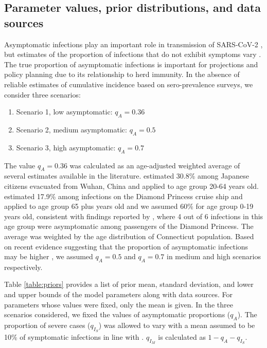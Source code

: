 \documentclass[11pt]{article}
\begin{document}
\subsection{Parameter values, prior distributions, and data sources}

Asymptomatic infections play an important role in transmission of SARS-CoV-2 \citep{furukawa2020evidence}, but estimates of the proportion of infections that do not exhibit symptoms vary \citep{he2020estimation, nishiura2020estimation, mizumoto2020estimating, emery2020contribution}. The true proportion of asymptomatic infections is important for projections and policy planning due to its relationship to herd immunity. In the absence of reliable estimates of cumulative incidence based on sero-prevalence surveys, we consider three scenarios: 

\begin{enumerate}
	\item Scenario 1, low asymptomatic: $q_A = 0.36$
	\item Scenario 2, medium asymptomatic: $q_A = 0.5$
	\item Scenario 3, high asymptomatic: $q_A = 0.7$
\end{enumerate}

The value $q_A = 0.36$ was calculated as an age-adjusted weighted average of several estimates available in the literature.  
\citet{nishiura2020estimation} estimated 30.8\% among Japanese citizens evacuated from Wuhan, China and applied to age group 20-64 years old.  
\citet{mizumoto2020estimating} estimated 17.9\% among infections on the Diamond Princess cruise ship and applied to age group 65 plus years old
and we assumed 60\% for age group 0-19 years old, consistent with findings reported by \citet{russell2020estimating}, where 4 out of 6 infections in this age group were asymptomatic among passengers of the Diamond Princess. 
The average was weighted by the age distribution of Connecticut population. 
Based on recent evidence suggesting that the proportion of asymptomatic infections may be higher \citep{he2020estimation, emery2020contribution, kimball2020asymptomatic}, we assumed $q_A = 0.5$ and $q_A = 0.7$ in medium and high scenarios respectively.  

Table \ref{table:priors} provides a list of prior mean, standard deviation, and lower and upper bounds of the model parameters along with data sources. For parameters whose values were fixed, only the mean is given. In the three scenarios considered, we fixed the values of asymptomatic proportions ($q_A$). The proportion of severe cases ($q_{I_S}$) was allowed to vary with a mean assumed to be 10\% of symptomatic infections in line with \citep{verity2020estimates, bi2020epidemiology, salje2020estimating}. $q_{I_M}$ is calculated as $1 - q_A - q_{I_S}$. 
\end{document}
